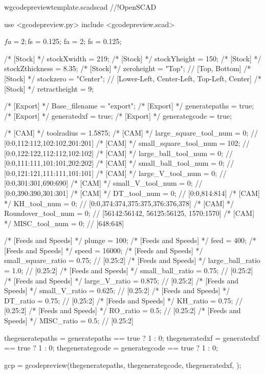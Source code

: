 \documentclass{ltxdoc}
\begin{document}
\lstset{firstnumber=1}%
\begin{writecode}{w}{gcodepreviewtemplate.scad}{scad}
//!OpenSCAD

use <gcodepreview.py>
include <gcodepreview.scad>

$fa = 2;
$fs = 0.125;
fa = 2;
fs = 0.125;

/* [Stock] */
stockXwidth = 219;
/* [Stock] */
stockYheight = 150;
/* [Stock] */
stockZthickness = 8.35;
/* [Stock] */
zeroheight = "Top"; // [Top, Bottom]
/* [Stock] */
stockzero = "Center"; // [Lower-Left, Center-Left, Top-Left, Center]
/* [Stock] */
retractheight = 9;

/* [Export] */
Base_filename = "export"; 
/* [Export] */
generatepaths = true; 
/* [Export] */
generatedxf = true; 
/* [Export] */
generategcode = true; 

/* [CAM] */
toolradius = 1.5875;
/* [CAM] */
large_square_tool_num = 0; // [0:0,112:112,102:102,201:201]
/* [CAM] */
small_square_tool_num = 102; // [0:0,122:122,112:112,102:102]
/* [CAM] */
large_ball_tool_num = 0; // [0:0,111:111,101:101,202:202]
/* [CAM] */
small_ball_tool_num = 0; // [0:0,121:121,111:111,101:101]
/* [CAM] */
large_V_tool_num = 0; // [0:0,301:301,690:690]
/* [CAM] */
small_V_tool_num = 0; // [0:0,390:390,301:301]
/* [CAM] */
DT_tool_num = 0; // [0:0,814:814]
/* [CAM] */
KH_tool_num = 0; // [0:0,374:374,375:375,376:376,378]
/* [CAM] */
Roundover_tool_num = 0; // [56142:56142, 56125:56125, 1570:1570]
/* [CAM] */
MISC_tool_num = 0; // [648:648]

/* [Feeds and Speeds] */
plunge = 100;
/* [Feeds and Speeds] */
feed = 400;
/* [Feeds and Speeds] */
speed = 16000;
/* [Feeds and Speeds] */
small_square_ratio = 0.75; // [0.25:2]
/* [Feeds and Speeds] */
large_ball_ratio = 1.0; // [0.25:2]
/* [Feeds and Speeds] */
small_ball_ratio = 0.75; // [0.25:2]
/* [Feeds and Speeds] */
large_V_ratio = 0.875; // [0.25:2]
/* [Feeds and Speeds] */
small_V_ratio = 0.625; // [0.25:2]
/* [Feeds and Speeds] */
DT_ratio = 0.75; // [0.25:2]
/* [Feeds and Speeds] */
KH_ratio = 0.75; // [0.25:2]
/* [Feeds and Speeds] */
RO_ratio = 0.5; // [0.25:2]
/* [Feeds and Speeds] */
MISC_ratio = 0.5; // [0.25:2]

thegeneratepaths = generatepaths == true ? 1 : 0;
thegeneratedxf = generatedxf == true ? 1 : 0;
thegenerategcode = generategcode == true ? 1 : 0;

gcp = gcodepreview(thegeneratepaths,
                   thegenerategcode,
                   thegeneratedxf,
                   );


\end{writecode}
\end{document}
